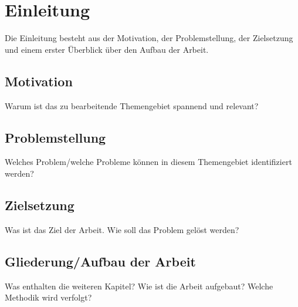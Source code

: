 
\chapter{Einleitung}
\label{ch:Einleitung}
Die Einleitung besteht aus der Motivation, der Problemstellung, der Zielsetzung und einem erster Überblick über den Aufbau der Arbeit.

\section{Motivation}
\label{ch:Einleitung:sec:Motivation}

Warum ist das zu bearbeitende Themengebiet spannend und relevant?

\section{Problemstellung}
\label{ch:Einleitung:sec:Problemstellung}

Welches Problem/welche Probleme können in diesem Themengebiet identifiziert werden?

\section{Zielsetzung}
\label{ch:Einleitung:sec:Zielsetzung}

Was ist das Ziel der Arbeit. Wie soll das Problem gelöst werden?


\section{Gliederung/Aufbau der Arbeit}
\label{ch:Einleitung:sec:Gliederung}

Was enthalten die weiteren Kapitel? Wie ist die Arbeit aufgebaut? Welche Methodik wird verfolgt?  

